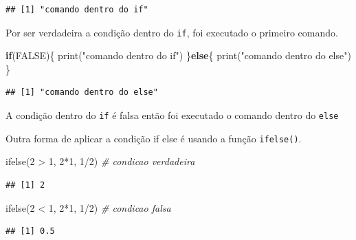 \documentclass[
]{book}
\newenvironment{Shaded}{\begin{snugshade}}{\end{snugshade}}
\newcommand{\CommentTok}[1]{\textcolor[rgb]{0.56,0.35,0.01}{\textit{#1}}}
\newcommand{\ConstantTok}[1]{\textcolor[rgb]{0.00,0.00,0.00}{#1}}
\newcommand{\ControlFlowTok}[1]{\textcolor[rgb]{0.13,0.29,0.53}{\textbf{#1}}}
\newcommand{\DecValTok}[1]{\textcolor[rgb]{0.00,0.00,0.81}{#1}}
\newcommand{\FunctionTok}[1]{\textcolor[rgb]{0.00,0.00,0.00}{#1}}
\newcommand{\NormalTok}[1]{#1}
\newcommand{\SpecialCharTok}[1]{\textcolor[rgb]{0.00,0.00,0.00}{#1}}
\newcommand{\StringTok}[1]{\textcolor[rgb]{0.31,0.60,0.02}{#1}}
\begin{document}
\begin{verbatim}
## [1] "comando dentro do if"
\end{verbatim}

Por ser verdadeira a condição dentro do \texttt{if}, foi executado o primeiro comando.

\begin{Shaded}
\begin{Highlighting}[]
\ControlFlowTok{if}\NormalTok{(}\ConstantTok{FALSE}\NormalTok{)\{}
  \FunctionTok{print}\NormalTok{(}\StringTok{"comando dentro do if"}\NormalTok{)}
\NormalTok{\}}\ControlFlowTok{else}\NormalTok{\{}
  \FunctionTok{print}\NormalTok{(}\StringTok{"comando dentro do else"}\NormalTok{)}
\NormalTok{\}}
\end{Highlighting}
\end{Shaded}

\begin{verbatim}
## [1] "comando dentro do else"
\end{verbatim}

A condição dentro do \texttt{if} é falsa então foi executado o comando dentro do \texttt{else}

Outra forma de aplicar a condição if else é usando a função \texttt{ifelse()}.

\begin{Shaded}
\begin{Highlighting}[]
\FunctionTok{ifelse}\NormalTok{(}\DecValTok{2} \SpecialCharTok{\textgreater{}} \DecValTok{1}\NormalTok{, }\DecValTok{2}\SpecialCharTok{*}\DecValTok{1}\NormalTok{, }\DecValTok{1}\SpecialCharTok{/}\DecValTok{2}\NormalTok{) }\CommentTok{\# condicao verdadeira}
\end{Highlighting}
\end{Shaded}

\begin{verbatim}
## [1] 2
\end{verbatim}

\begin{Shaded}
\begin{Highlighting}[]
\FunctionTok{ifelse}\NormalTok{(}\DecValTok{2} \SpecialCharTok{\textless{}} \DecValTok{1}\NormalTok{, }\DecValTok{2}\SpecialCharTok{*}\DecValTok{1}\NormalTok{, }\DecValTok{1}\SpecialCharTok{/}\DecValTok{2}\NormalTok{) }\CommentTok{\# condicao falsa}
\end{Highlighting}
\end{Shaded}

\begin{verbatim}
## [1] 0.5
\end{verbatim}
\end{document}
